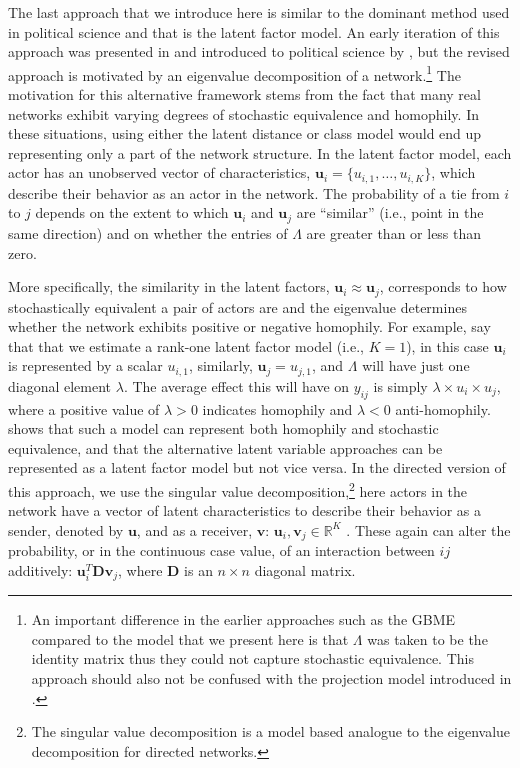 \documentclass[12pt,onesided,pdflatex]{amsart}
\begin{document}
The last approach that we introduce here is similar to the dominant method used in political science and that is the latent factor model. An early iteration of this approach was presented in \citet{hoff:2005} and introduced to political science by \citet{hoff:ward:2004}, but the revised approach is motivated by an eigenvalue decomposition of a network.\footnote{An important difference in the earlier approaches such as the GBME compared to the model that we present here is that $\Lambda$ was taken to be the identity matrix thus they could not capture stochastic equivalence. This approach should also not be confused with the projection model introduced in \citet{hoff:etal:2002}.} The motivation for this alternative framework stems from the fact that many real networks exhibit varying degrees of stochastic equivalence and homophily. In these situations, using either the latent distance or class model would end up representing only a part of the network structure. In the latent factor model, each actor has an unobserved vector of characteristics, $\textbf{u}_{i} = \{u_{i,1}, \ldots, u_{i,K} \}$, which describe their behavior as an actor in the network. The probability of a tie from $i$ to $j$ depends on the extent to which $\textbf{u}_{i}$ and $\textbf{u}_{j}$ are ``similar'' (i.e., point in the same direction) and on whether the entries of $\Lambda$ are greater than or less than zero. 

More specifically, the similarity in the latent factors, $\textbf{u}_{i} \approx \textbf{u}_{j}$, corresponds to how stochastically equivalent a pair of actors are and the eigenvalue determines whether the network exhibits positive or negative homophily. For example, say that that we estimate a rank-one latent factor model (i.e., $K=1$), in this case $\textbf{u}_{i}$ is represented by a scalar $u_{i,1}$, similarly, $\textbf{u}_{j}=u_{j,1}$, and $\Lambda$ will have just one diagonal element $\lambda$. The average effect this will have on $y_{ij}$ is simply $\lambda \times u_{i} \times u_{j}$, where a positive value of $\lambda>0$ indicates homophily and $\lambda<0$ anti-homophily. \citet{hoff:2008} shows that such a model can represent both homophily and stochastic equivalence, and that the alternative latent variable approaches can be represented as a latent factor model but not vice versa. In the directed version of this approach, we use the singular value decomposition,\footnote{The singular value decomposition is a model based analogue to the eigenvalue decomposition for directed networks.} here actors in the network have a vector of latent characteristics to describe their behavior as a sender, denoted by $\textbf{u}$, and as a receiver, $\textbf{v}$: $\textbf{u}_{i}, \textbf{v}_{j} \in \mathbb{R}^{K}$ \citep{hoff:2009}. These again can alter the probability, or in the continuous case value, of an interaction between $ij$ additively: $\textbf{u}_{i}^{T} \textbf{D} \textbf{v}_{j}$, where $\textbf{D}$ is an $n \times n$ diagonal matrix. 
\end{document}
